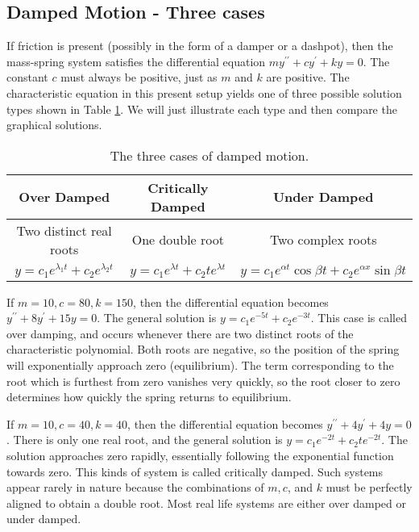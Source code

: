 \subsection{Damped Motion - Three cases}
If friction is present (possibly in the form of a damper or a dashpot), then the mass-spring system satisfies the differential equation $my^{\prime\prime}+cy^\prime+ky=0$. The constant $c$ must always be positive, just as $m$ and $k$ are positive. The characteristic equation in this present setup yields one of three possible solution types shown in Table \ref{dampedtable}. We will just illustrate each type and then compare the graphical solutions.

\begin{table}%
\begin{tabular}{ccc}
\hline
Over Damped & Critically Damped & Under Damped\\\hline\hline
Two distinct real roots & One double root & Two complex roots\\
$y = c_1 e^{\lambda_1t}+ c_2 e^{\lambda_2t}$ &$y = c_1 e^{\lambda t}+ c_2 t e^{\lambda t}$ &$y = c_1 e^{\alpha t}\cos \beta t+ c_2 e^{\alpha x}\sin \beta t$
\\\hline
\end{tabular}
\caption{The three cases of damped motion.}
\label{dampedtable}
\end{table}

\begin{example}
If $m=10, c=80, k=150$, then the differential equation becomes $y^{\prime\prime}+8y^\prime+15y=0$.  The general solution is $y=c_1e^{-5t}+c_2e^{-3t}$. This case is called over damping, and occurs whenever there are two distinct roots of the characteristic polynomial. Both roots are negative, so the position of the spring will exponentially approach zero (equilibrium).  The term corresponding to the root which is furthest from zero vanishes very quickly, so the root closer to zero determines how quickly the spring returns to equilibrium.
\end{example}

\begin{example}
If $m=10, c=40, k=40$, then the differential equation becomes  $y^{\prime\prime}+4y^\prime+4y=0$. There is only one real root, and the general solution is $y= c_1e^{-2t} + c_2te^{-2 t}$. 
The solution approaches zero rapidly, essentially following the exponential function towards zero. This kinds of system is called critically damped. Such systems appear rarely in nature because the combinations of $m,c$, and $k$ must be perfectly aligned to obtain a double root.  Most real life systems are either over damped or under damped.
\end{example}

